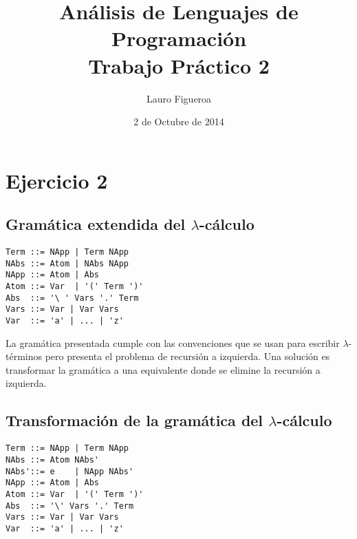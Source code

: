 \documentclass[a4paper,12pt]{article}
\begin{document}
\title{Análisis de Lenguajes de Programación\\ 
        Trabajo Práctico 2}
\author{Lauro Figueroa}
\date{2 de Octubre de 2014}
\maketitle

\newpage
{}

\section*{Ejercicio 2}

\subsection*{Gramática extendida del $\lambda$-cálculo}

\iffalse
\begin{verbatim}
Term ::= Var | '\' Var '.' Term | Term Term | '(' Term ')' 
Var ::= 'a' | ... | 'z'
\end{verbatim}


\begin{verbatim}
Term ::= NApp | Term NApp
NApp ::= Var | '\' Var '.' Term | '(' Term ')'
Var ::= 'a' | ... | 'z'
\end{verbatim}
\fi

\begin{verbatim}
Term ::= NApp | Term NApp
NAbs ::= Atom | NAbs NApp
NApp ::= Atom | Abs
Atom ::= Var  | '(' Term ')'
Abs  ::= '\ ' Vars '.' Term 
Vars ::= Var | Var Vars
Var  ::= 'a' | ... | 'z'
\end{verbatim}

La gramática presentada cumple con las convenciones que se usan para escribir
$\lambda$-términos pero  presenta el problema de recursión a izquierda.
Una solución es transformar la gramática a una equivalente donde se elimine la
recursión a izquierda.

\subsection*{Transformación de la gramática del $\lambda$-cálculo}

\begin{verbatim}
Term ::= NApp | Term NApp
NAbs ::= Atom NAbs'
NAbs'::= e    | NApp NAbs'
NApp ::= Atom | Abs
Atom ::= Var  | '(' Term ')'
Abs  ::= '\' Vars '.' Term 
Vars ::= Var | Var Vars
Var  ::= 'a' | ... | 'z'
\end{verbatim}
\end{document}
